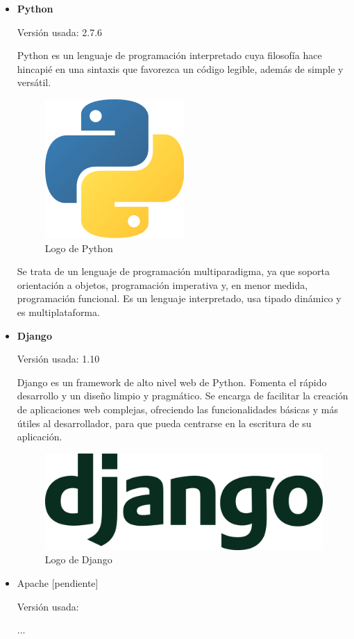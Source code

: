 \begin{itemize}
	\item \textbf{Python}
	
		Versión usada: 2.7.6
		
		Python \cite{python} es un lenguaje de programación interpretado cuya filosofía hace hincapié en una sintaxis que favorezca un código legible, además de simple y versátil.
				
		\bigskip
		\begin{figure}[h]
			\centering
			\includegraphics[width=0.2\linewidth]{../images/python}
			\caption[Logo de Python]{Logo de Python}
			\label{fig:pythonlogo}
		\end{figure}
		
		Se trata de un lenguaje de programación multiparadigma, ya que soporta orientación a objetos, programación imperativa y, en menor medida, programación funcional. Es un lenguaje interpretado, usa tipado dinámico y es multiplataforma.
		
	\item \textbf{Django}
	
		Versión usada: 1.10
		
		Django \cite{django} es un framework de alto nivel web de Python. Fomenta el rápido desarrollo y un diseño limpio y pragmático. Se encarga de facilitar la creación de aplicaciones web complejas, ofreciendo las funcionalidades básicas y más útiles al desarrollador, para que pueda centrarse en la escritura de su aplicación.
		
		\bigskip
		\begin{figure}[h]
			\centering
			\includegraphics[width=0.3\linewidth]{../images/djangologo}
			\caption[Logo de Django]{Logo de Django}
			\label{fig:djangologo}
		\end{figure}
				
	\item Apache      [pendiente]
	
		Versión usada: 
		
		...
		

\end{itemize}
